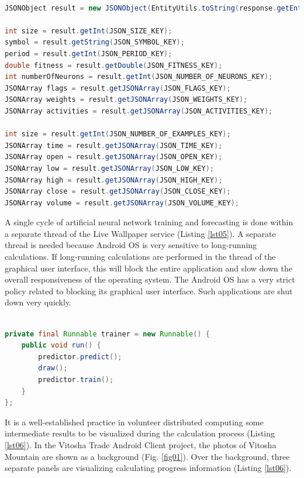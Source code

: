 \documentclass[a4paper,conference]{IEEEtran}
\begin{document}
\begin{lstlisting}[caption=JSON packaging, language=Java, basicstyle=\tiny, label=lst04]

JSONObject result = new JSONObject(EntityUtils.toString(response.getEntity(), "UTF-8"));

int size = result.getInt(JSON_SIZE_KEY);
symbol = result.getString(JSON_SYMBOL_KEY);
period = result.getInt(JSON_PERIOD_KEY);
double fitness = result.getDouble(JSON_FITNESS_KEY);
int numberOfNeurons = result.getInt(JSON_NUMBER_OF_NEURONS_KEY);
JSONArray flags = result.getJSONArray(JSON_FLAGS_KEY);
JSONArray weights = result.getJSONArray(JSON_WEIGHTS_KEY);
JSONArray activities = result.getJSONArray(JSON_ACTIVITIES_KEY);

int size = result.getInt(JSON_NUMBER_OF_EXAMPLES_KEY);
JSONArray time = result.getJSONArray(JSON_TIME_KEY);
JSONArray open = result.getJSONArray(JSON_OPEN_KEY);
JSONArray low = result.getJSONArray(JSON_LOW_KEY);
JSONArray high = result.getJSONArray(JSON_HIGH_KEY);
JSONArray close = result.getJSONArray(JSON_CLOSE_KEY);
JSONArray volume = result.getJSONArray(JSON_VOLUME_KEY);

\end{lstlisting}

A single cycle of artificial neural network training and forecasting is done within a separate thread of the Live Wallpaper service (Listing \ref{lst05}). A separate thread is needed because Android OS is very sensitive to long-running calculations. If long-running calculations are performed in the thread of the graphical user interface, this will block the entire application and slow down the overall responsiveness of the operating system. The Android OS has a very strict policy related to blocking its graphical user interface. Such applications are shut down very quickly.

\begin{lstlisting}[caption=Calculations in separate thread, language=Java, basicstyle=\tiny, label=lst05]

private final Runnable trainer = new Runnable() {
    public void run() {
        predictor.predict();
        draw();
        predictor.train();
    }
};

\end{lstlisting}

It is a well-established practice in volunteer distributed computing some intermediate results to be visualized during the calculation process (Listing \ref{lst06}). In the Vitosha Trade Android Client project, the photos of Vitosha Mountain are shown as a background (Fig. \ref{fig01}). Over the background, three separate panels are visualizing calculating progress information (Listing \ref{lst06}).
\end{document}
